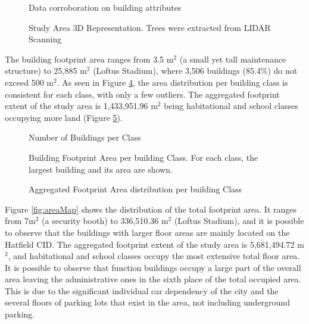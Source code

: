 \documentclass[authoryear,preprint,review,12pt]{elsarticle}
\begin{document}
    \begin{figure}
        \caption{Data corroboration on building attributes}
        \label{fig:corroboration}
    \end{figure}

    \begin{figure}
        \caption{Study Area 3D Representation. Trees were extracted from LIDAR Scanning}
        \label{fig:3Drepr1}
    \end{figure}

    The building footprint area ranges from 3.5 m$^2$ (a small yet tall maintenance structure) to 25,885 m$^2$ (Loftus Stadium), where 3,506 buildings (85.4\%) do not exceed 500 m$^2$. As seen in Figure \ref{fig:buildfoot}, the area distribution per building class is consistent for each class, with only a few outliers. The aggregated footprint extent of the study area is 1,433,951.96 m$^2$ being habitational and school classes occupying more land (Figure \ref{fig:buildAgg}).

    \begin{figure}
        \caption{Number of Buildings per Class}
        \label{fig:buildclass}
    \end{figure}

    \begin{figure}
        \caption{Building Footprint Area per building Class. For each class, the largest building and its area are shown.}
        \label{fig:buildfoot}
    \end{figure}

    \begin{figure}
        \caption{Aggregated Footprint Area distribution per building Class}
        \label{fig:buildAgg}
    \end{figure}

    Figure \ref{fig:areaMap} shows the distribution of the total footprint area. It ranges from 7m$^2$ (a security booth) to 336,510.36 m$^2$ (Loftus Stadium), and it is possible to observe that the buildings with larger floor areas are mainly located on the Hatfield CID. The aggregated footprint extent of the study area is 5,681,494.72 m$^2$, and habitational and school classes occupy the most extensive total floor area. It is possible to observe that function buildings occupy a large part of the overall area leaving the administrative ones in the sixth place of the total occupied area. This is due to the significant individual car dependency of the city and the several floors of parking lots that exist in the area, not including underground parking.
\end{document}
